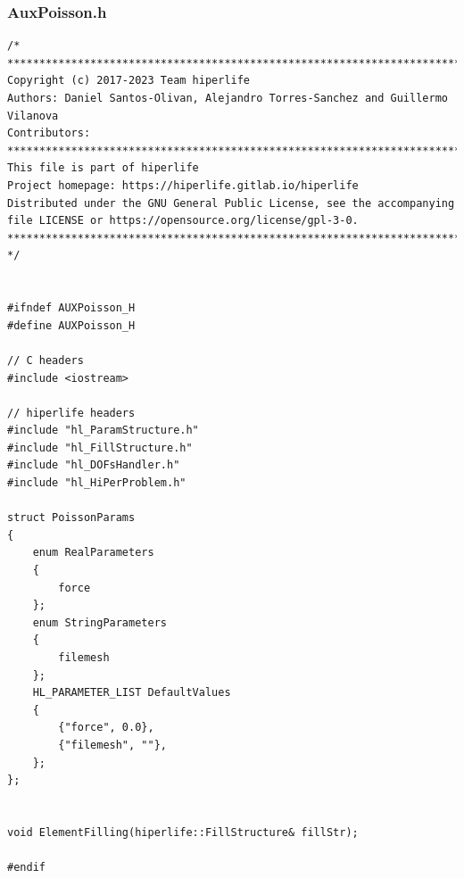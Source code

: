 \documentclass[]{article}
\begin{document}
\subsubsection{AuxPoisson.h} \label{sec: a.h}
\begin{lstlisting}
/*
*******************************************************************************
Copyright (c) 2017-2023 Team hiperlife
Authors: Daniel Santos-Olivan, Alejandro Torres-Sanchez and Guillermo Vilanova
Contributors:
*******************************************************************************
This file is part of hiperlife
Project homepage: https://hiperlife.gitlab.io/hiperlife
Distributed under the GNU General Public License, see the accompanying
file LICENSE or https://opensource.org/license/gpl-3-0.
*******************************************************************************
*/


#ifndef AUXPoisson_H
#define AUXPoisson_H

// C headers
#include <iostream>

// hiperlife headers
#include "hl_ParamStructure.h"
#include "hl_FillStructure.h"
#include "hl_DOFsHandler.h"
#include "hl_HiPerProblem.h"

struct PoissonParams
{
	enum RealParameters
	{
		force
	};
	enum StringParameters
	{
		filemesh
	};
	HL_PARAMETER_LIST DefaultValues
	{
		{"force", 0.0},
		{"filemesh", ""},
	};
};


void ElementFilling(hiperlife::FillStructure& fillStr);

#endif
\end{lstlisting}
\end{document}
